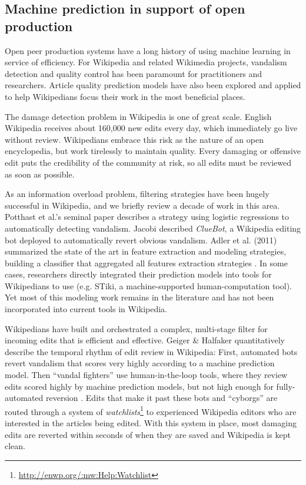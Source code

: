 \subsection{Machine prediction in support of open production}
Open peer production systems have a long history of using machine learning in service of efficiency. For Wikipedia and related Wikimedia projects, vandalism detection and quality control has been paramount for practitioners and researchers.  Article quality prediction models have also been explored and applied to help Wikipedians focus their work in the most beneficial places.

 The damage detection problem in Wikipedia is one of great scale.  English Wikipedia receives about 160,000 new edits every day, which immediately go live without review.  Wikipedians embrace this risk as the nature of an open encyclopedia, but work tirelessly to maintain quality. Every damaging or offensive edit puts the credibility of the community at risk, so all edits must be reviewed as soon as possible.  

As an information overload problem, filtering strategies have been hugely successful in Wikipedia, and we briefly review a decade of work in this area. Potthast et al.'s seminal paper\cite{potthast2008automatic} describes a strategy using logistic regressions to automatically detecting vandalism. Jacobi described \emph{ClueBot}\cite{carter2008cluebot}, a Wikipedia editing bot deployed to automatically revert obvious vandalism. Adler et al. (2011) summarized the state of the art in feature extraction and modeling strategies, building a classifier that aggregated all features extraction strategies \cite{adler2011wikipedia}.  In some cases, researchers directly integrated their prediction models into tools for Wikipedians to use (e.g. STiki\cite{west2010stiki}, a machine-supported human-computation tool). Yet most of this modeling work remains in the literature and has not been incorporated into current tools in Wikipedia.

Wikipedians have built and orchestrated a complex, multi-stage filter for incoming edits that is efficient and effective.  Geiger \& Halfaker quantitatively describe the temporal rhythm of edit review in Wikipedia\cite{geiger2013levee}: First, automated bots revert vandalism that scores very highly according to a machine prediction model. Then ``vandal fighters'' use human-in-the-loop tools, where they review edits scored highly by machine prediction models, but not high enough for fully-automated reversion \cite{geiger2010work}.  Edits that make it past these bots and ``cyborgs''\cite{halfaker2012bots} are routed through a system of \emph{watchlists}\footnote{\url{http://enwp.org/:mw:Help:Watchlist}} to experienced Wikipedia editors who are interested in the articles being edited.  With this system in place, most damaging edits are reverted within seconds of when they are saved\cite{geiger2013levee} and Wikipedia is kept clean.

